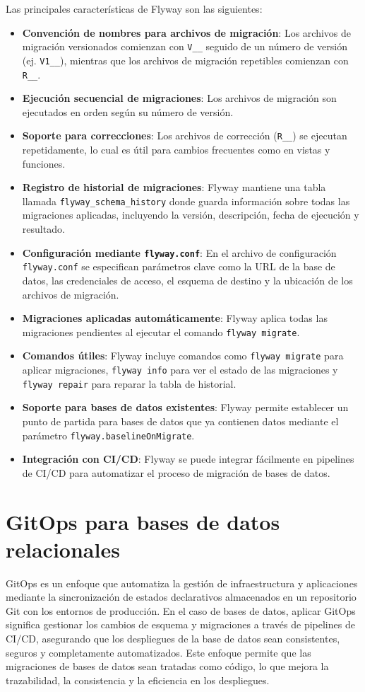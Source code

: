 \documentclass{IEEEtran}
\begin{document}
Las principales características de Flyway son las siguientes:

\begin{itemize}
    \item \textbf{Convención de nombres para archivos de migración}: Los archivos de migración versionados comienzan con \texttt{V\_\_} seguido de un número de versión (ej. \texttt{V1\_\_}), mientras que los archivos de migración repetibles comienzan con \texttt{R\_\_}.
    \item \textbf{Ejecución secuencial de migraciones}: Los archivos de migración son ejecutados en orden según su número de versión.
    \item \textbf{Soporte para correcciones}: Los archivos de corrección (\texttt{R\_\_}) se ejecutan repetidamente, lo cual es útil para cambios frecuentes como en vistas y funciones.
    \item \textbf{Registro de historial de migraciones}: Flyway mantiene una tabla llamada \texttt{flyway\_schema\_history} donde guarda información sobre todas las migraciones aplicadas, incluyendo la versión, descripción, fecha de ejecución y resultado.
    \item \textbf{Configuración mediante \texttt{flyway.conf}}: En el archivo de configuración \texttt{flyway.conf} se especifican parámetros clave como la URL de la base de datos, las credenciales de acceso, el esquema de destino y la ubicación de los archivos de migración.
    \item \textbf{Migraciones aplicadas automáticamente}: Flyway aplica todas las migraciones pendientes al ejecutar el comando \texttt{flyway migrate}.
    \item \textbf{Comandos útiles}: Flyway incluye comandos como \texttt{flyway migrate} para aplicar migraciones, \texttt{flyway info} para ver el estado de las migraciones y \texttt{flyway repair} para reparar la tabla de historial.
    \item \textbf{Soporte para bases de datos existentes}: Flyway permite establecer un punto de partida para bases de datos que ya contienen datos mediante el parámetro \texttt{flyway.baselineOnMigrate}.
    \item \textbf{Integración con CI/CD}: Flyway se puede integrar fácilmente en pipelines de CI/CD para automatizar el proceso de migración de bases de datos.
\end{itemize}


\section{GitOps para bases de datos relacionales}
GitOps es un enfoque que automatiza la gestión de infraestructura y aplicaciones mediante la sincronización de estados declarativos almacenados en un repositorio Git con los entornos de producción. En el caso de bases de datos, aplicar GitOps significa gestionar los cambios de esquema y migraciones a través de pipelines de CI/CD, asegurando que los despliegues de la base de datos sean consistentes, seguros y completamente automatizados. Este enfoque permite que las migraciones de bases de datos sean tratadas como código, lo que mejora la trazabilidad, la consistencia y la eficiencia en los despliegues.
\end{document}
